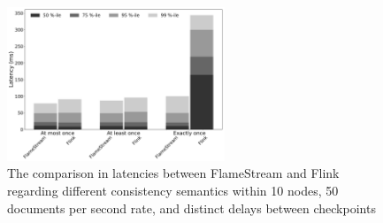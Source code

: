 \begin{figure}[htbp]
  \centering
  \includegraphics[width=0.58\textwidth]{pics/comparison}
  \caption{The comparison in latencies between FlameStream and Flink regarding different consistency semantics within 10 nodes, 50 documents per second rate, and distinct delays between checkpoints}
  \label {performance}
\end{figure}